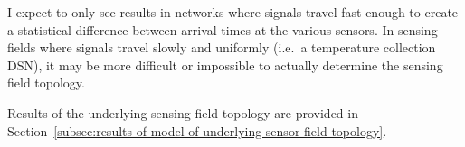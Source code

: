 I expect to only see results in networks where signals travel fast enough to create a statistical difference between arrival times at the various sensors. In sensing fields where signals travel slowly and uniformly (i.e.\ a temperature collection DSN), it may be more difficult or impossible to actually determine the sensing field topology.

Results of the underlying sensing field topology are provided in Section~\ref{subsec:results-of-model-of-underlying-sensor-field-topology}.
